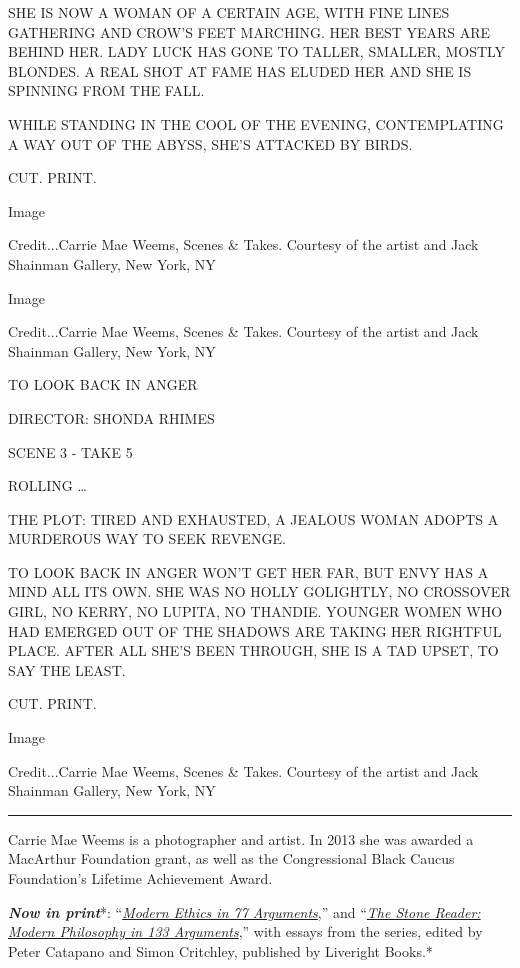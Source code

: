 SHE IS NOW A WOMAN OF A CERTAIN AGE, WITH FINE LINES GATHERING AND
CROW'S FEET MARCHING. HER BEST YEARS ARE BEHIND HER. LADY LUCK HAS GONE
TO TALLER, SMALLER, MOSTLY BLONDES. A REAL SHOT AT FAME HAS ELUDED HER
AND SHE IS SPINNING FROM THE FALL.

WHILE STANDING IN THE COOL OF THE EVENING, CONTEMPLATING A WAY OUT OF
THE ABYSS, SHE'S ATTACKED BY BIRDS.

CUT. PRINT.

Image

Credit...Carrie Mae Weems, Scenes \& Takes. Courtesy of the artist and
Jack Shainman Gallery, New York, NY

Image

Credit...Carrie Mae Weems, Scenes \& Takes. Courtesy of the artist and
Jack Shainman Gallery, New York, NY

TO LOOK BACK IN ANGER

DIRECTOR: SHONDA RHIMES

SCENE 3 - TAKE 5

ROLLING \ldots{}

THE PLOT: TIRED AND EXHAUSTED, A JEALOUS WOMAN ADOPTS A MURDEROUS WAY TO
SEEK REVENGE.

TO LOOK BACK IN ANGER WON'T GET HER FAR, BUT ENVY HAS A MIND ALL ITS
OWN. SHE WAS NO HOLLY GOLIGHTLY, NO CROSSOVER GIRL, NO KERRY, NO LUPITA,
NO THANDIE. YOUNGER WOMEN WHO HAD EMERGED OUT OF THE SHADOWS ARE TAKING
HER RIGHTFUL PLACE. AFTER ALL SHE'S BEEN THROUGH, SHE IS A TAD UPSET, TO
SAY THE LEAST.

CUT. PRINT.

Image

Credit...Carrie Mae Weems, Scenes \& Takes. Courtesy of the artist and
Jack Shainman Gallery, New York, NY

\begin{center}\rule{0.5\linewidth}{\linethickness}\end{center}

Carrie Mae Weems is a photographer and artist. In 2013 she was awarded a
MacArthur Foundation grant, as well as the Congressional Black Caucus
Foundation's Lifetime Achievement Award.

\emph{\textbf{Now in print}}*:
``\emph{\href{http://bitly.com/1MW2kN3}{\emph{Modern Ethics in 77
Arguments}}},'' and ``\emph{\href{http://bitly.com/1MW2kN3}{\emph{The
Stone Reader: Modern Philosophy in 133 Arguments}}},'' with essays from
the series, edited by Peter Catapano and Simon Critchley, published by
Liveright Books.*

